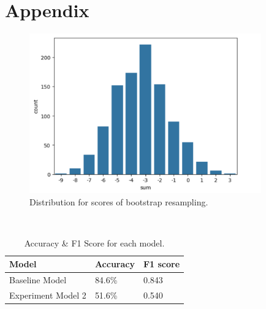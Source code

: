 \documentclass[11pt]{article}
\begin{document}
\section{Appendix}
\label{sec:appendix}

\begin{figure}[h]
    \centering
    \includegraphics[width=10cm]{figure/figure.png}
    \caption{Distribution for scores of bootstrap resampling.}
    \label{fig:example}
\end{figure}

\\

\begin{table}[ht]
\centering
\begin{tabular}{lll}
\hline
\textbf{Model} & \textbf{Accuracy} & \textbf{F1 score} \\ 
\hline
Baseline Model & 84.6\% & 0.843 \\ 
Experiment Model 2& 51.6\% & 0.540 \\ 
\end{tabular}
\caption{\label{citation-guide}
Accuracy \& F1 Score for each model.
}
\end{table}
\end{document}
